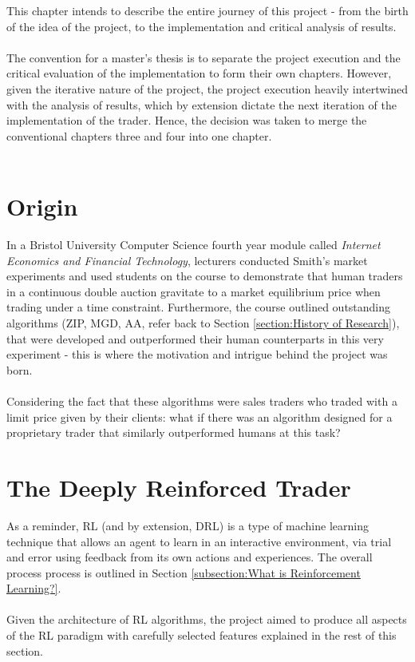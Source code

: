 \documentclass[ %
                    author={Ashwinder Khurana},
                supervisor={Prof Dave Cliff},
                    degree={MEng},
                     title={The Deeply Reinforced Trader},
                  subtitle={},
                      type={enterprise},
                      year={2020} ]{dissertation}
\begin{document}
{\noindent 
This chapter intends to describe the entire journey of this project - from the birth of the idea of the project, to the implementation and critical analysis of results. 
\\
\\
The convention for a master's thesis is to separate the project execution and the critical evaluation of the implementation to form their own chapters. However, given the iterative nature of the project, the project execution heavily intertwined with the analysis of results, which by extension dictate the next iteration of the implementation of the trader. Hence, the decision was taken to merge the conventional chapters three and four into one chapter. 
\\
\\
\section{Origin}
In a Bristol University Computer Science fourth year module called \textit{Internet Economics and Financial Technology}, lecturers conducted Smith's market experiments \cite{vernon-smith} and used students on the course to demonstrate that human traders in a continuous double auction gravitate to a market equilibrium price when trading under a time constraint. Furthermore, the course outlined outstanding algorithms (ZIP, MGD, AA, refer back to Section \ref{section:History of Research}), that were developed and outperformed their human counterparts in this very experiment - this is where the motivation and intrigue behind the project was born. 
\\
\\
\noindent
Considering the fact that these algorithms were sales traders who traded with a limit price given by their clients: what if there was an algorithm designed for a proprietary trader that similarly outperformed humans at this task?

\section{The Deeply Reinforced Trader}
\label{section:The Deeply Reinforced Trader}
As a reminder, RL (and by extension, DRL) is a type of machine learning technique that allows an agent to learn in an interactive environment, via trial and error using feedback from its own actions and experiences. The overall process process is outlined in Section \ref{subsection:What is Reinforcement Learning?}. 
\\
\\
\noindent
Given the architecture of RL algorithms, the project aimed to produce all aspects of the RL paradigm with carefully selected features explained in the rest of this section. 


}
\end{document}
